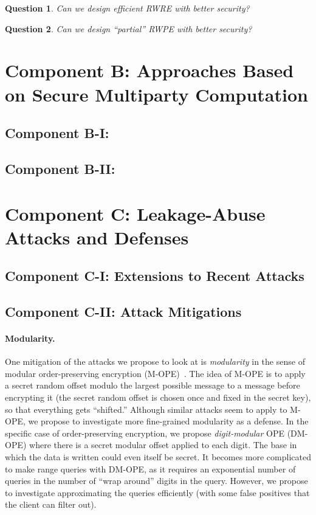 \documentclass[11pt]{article}
\newtheorem{question}{Question}[section]
\theoremstyle{remark}
\begin{document}
\begin{question}
Can we design efficient RWRE with better security?
\end{question}

\begin{question}
Can we design ``partial'' RWPE with better security?
\end{question}


 \section{Component B: Approaches Based on Secure Multiparty Computation}

\subsection{Component B-I:  }

\subsection{Component B-II:  }


\section{Component C: Leakage-Abuse Attacks and Defenses}

\subsection{Component C-I: Extensions to Recent Attacks}

\subsection{Component C-II:  Attack Mitigations}

\paragraph*{Modularity.}  One mitigation of the attacks we propose to look at is \emph{modularity} in the sense of modular order-preserving encryption (M-OPE)~\cite{C:BolCheOne11}.  The idea of M-OPE is to apply a secret random offset modulo the largest possible message to a message before encrypting it (the secret random offset is chosen once and fixed in the secret key), so that everything gets ``shifted.''  Although similar attacks seem to apply to M-OPE, we propose to investigate more fine-grained modularity as a defense.  In the specific case of order-preserving encryption, we propose \emph{digit-modular} OPE (DM-OPE) where there is a secret modular offset applied to each digit.  The base in which the data is written could even itself be secret.  It becomes more complicated to make range queries with DM-OPE, as it requires an exponential number of queries in the number of ``wrap around'' digits in the query.  However, we propose to investigate approximating the queries efficiently (with some false positives that the client can filter out).
\end{document}
